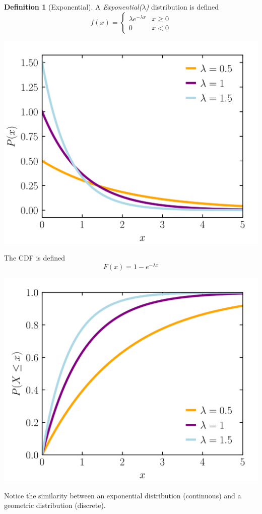 \documentclass{article}
\theoremstyle{remark}
\theoremstyle{definition}
\newtheorem{definition}{Definition}[section]
\begin{document}
\begin{definition}[Exponential]
A \textit{Exponential($\lambda$)} distribution is defined
\[f(x) = \begin{cases}
\lambda e^{-\lambda x} & x \geq 0 \\
0 & x < 0
\end{cases}\]
\begin{center}
    \includegraphics[scale=0.15]{img/Exponential_Distribution_Model.png}
\end{center}
The CDF is defined
\[F(x) = 1 - e^{-\lambda x}\]
\begin{center}
    \includegraphics[scale=0.15]{img/Exponential_Distribution_Model_2.png}
\end{center}
Notice the similarity between an exponential distribution (continuous) and a geometric distribution (discrete). 
\end{definition}
\end{document}
